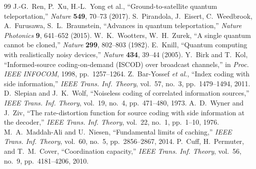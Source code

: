 \documentclass[12pt,a4paper]{article}
\begin{document}
\begin{thebibliography}{99}
		 J.-G.~Ren, P.~Xu, H.-L.~Yong et al., ``Ground-to-satellite quantum teleportation,'' \emph{Nature} \textbf{549}, 70--73 (2017).
		 S.~Pirandola, J.~Eisert, C.~Weedbrook, A.~Furusawa, S.~L.~Braunstein, ``Advances in quantum teleportation,'' \emph{Nature Photonics} \textbf{9}, 641--652 (2015).
		 W.~K.~Wootters, W.~H.~Zurek, ``A single quantum cannot be cloned,'' \emph{Nature} \textbf{299}, 802--803 (1982).
		 E.~Knill, ``Quantum computing with realistically noisy devices,'' \emph{Nature} \textbf{434}, 39--44 (2005).
		 Y.~Birk and T.~Kol, ``Informed-source coding-on-demand (ISCOD) over broadcast channels,'' in \emph{Proc. IEEE INFOCOM}, 1998, pp.~1257--1264.
		 Z.~Bar-Yossef \emph{et al.}, ``Index coding with side information,'' \emph{IEEE Trans. Inf. Theory}, vol.~57, no.~3, pp.~1479--1494, 2011.
		 D.~Slepian and J.~K.~Wolf, ``Noiseless coding of correlated information sources,'' \emph{IEEE Trans. Inf. Theory}, vol.~19, no.~4, pp.~471--480, 1973.
		 A.~D.~Wyner and J.~Ziv, ``The rate-distortion function for source coding with side information at the decoder,'' \emph{IEEE Trans. Inf. Theory}, vol.~22, no.~1, pp.~1--10, 1976.
		 M.~A.~Maddah-Ali and U.~Niesen, ``Fundamental limits of caching,'' \emph{IEEE Trans. Inf. Theory}, vol.~60, no.~5, pp.~2856--2867, 2014.
		 P.~Cuff, H.~Permuter, and T.~M.~Cover, ``Coordination capacity,'' \emph{IEEE Trans. Inf. Theory}, vol.~56, no.~9, pp.~4181--4206, 2010.
	\end{thebibliography}
	
\end{document}
